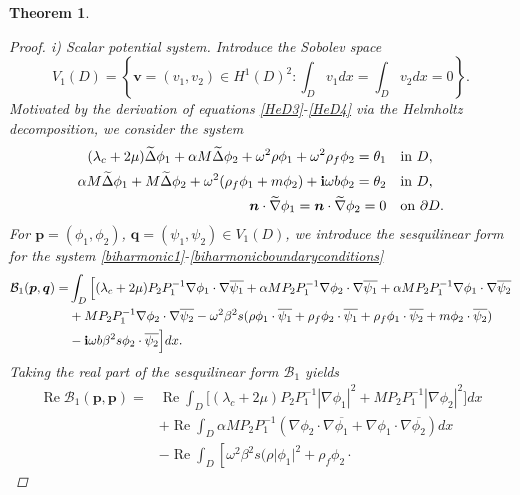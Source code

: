 \documentclass[11pt]{article}
\newcommand{\ds}{\displaystyle}
\newcommand{\no}{\nonumber}
\newcommand{\pa}{\partial}
\newcommand{\la}{\lambda}
\newcommand{\wid}{\widetilde}
\newcommand{\bs}{\boldsymbol}
\newtheorem{theorem}{Theorem}[section]
\providecommand{\Rp}{\operatorname{Re}}%
\begin{document}
\begin{theorem}
\begin{proof}
i) \textit{Scalar potential system.}
Introduce the Sobolev space
\begin{equation*}
V_1(D) = \left\{\bs{v}=(v_1,v_2)\in H^1(D)^2 : \ds\int_D v_1dx = \int_D v_2dx = 0\right\}.
\end{equation*}
Motivated by the derivation of equations \eqref{HeD3}-\eqref{HeD4} via the Helmholtz decomposition, 
we consider the system
\begin{align}
(\la_c+2\mu)\wid{\Delta}\phi_1 + \alpha M\wid{\Delta}\phi_2 + \omega^2\rho\phi_1 + \omega^2\rho_f\phi_2 
= \theta_1  &\quad\text{in }  D,\label{biharmonic1}\\
\alpha M\wid{\Delta}\phi_1 + M\wid{\Delta}\phi_2 + \omega^2(\rho_f\phi_1+m\phi_2) + {\bf i}\omega b\phi_2 
= \theta_2  &\quad\text{in }  D, \label{biharmonic2}\\
\bs{n}\cdot\wid{\nabla}\phi_1 =\bs{n}\cdot\wid{\nabla}\phi_2 = 0 &\quad\text{on } \pa D. 
\label{biharmonicboundaryconditions}
\end{align}
For $\bs{p}=(\phi_1,\phi_2)$, $\bs{q}=(\psi_1,\psi_2)\in V_1(D)$, we introduce the sesquilinear 
form for the system \eqref{biharmonic1}-\eqref{biharmonicboundaryconditions} 
\begin{equation*}
\begin{aligned}
\mathcal{B}_{1}(\bs{p},\bs{q})=&\int_{D}\Big[ (\la_c+2\mu) P_2P_1^{-1}\nabla\phi_1\cdot
\nabla\overline{\psi_1} +\alpha M P_2P_1^{-1}\nabla\phi_2\cdot\nabla\overline{\psi_1}+
\alpha M P_2P_1^{-1}\nabla\phi_1\cdot\nabla\overline{\psi_2}\\
& + M P_2P_1^{-1}\nabla\phi_2\cdot\nabla\overline{\psi_2} -\omega^2\beta^2s
(\rho\phi_1\cdot\overline{\psi_1} +\rho_f \phi_2\cdot\overline{\psi_1}+
\rho_f\phi_1\cdot\overline{\psi_2} +m\phi_2\cdot\overline{\psi_2})\\
&-{\bf i}\omega b\beta^2s\phi_2\cdot\overline{\psi_2}\Big] dx.
\end{aligned}
\end{equation*}
Taking the real part of the sesquilinear form $\mathcal{B}_{1}$ yields
\begin{align}
\Rp\mathcal{B}_{1}(\bs{p},\bs{p})=&\Rp\int_{D} \Big[(\la_c+2\mu) P_2P_1^{-1}|\nabla\phi_1|^2
+ M P_2P_1^{-1}|\nabla\phi_2|^2\Big]dx \no\\ \label{realpart_B1}
&+\Rp\int_{D}\alpha MP_2P_1^{-1}\left(\nabla\phi_2\cdot\nabla\overline{\phi_1}+\nabla\phi_1
\cdot\nabla\overline{\phi_2}\right)dx\\ \no
& -\Rp\int_{D}\left[\omega^2\beta^2s(\rho\lvert\phi_1\rvert^2 +\rho_f \phi_2\cdot

\end{align}
\end{proof}
\end{theorem}
\end{document}
